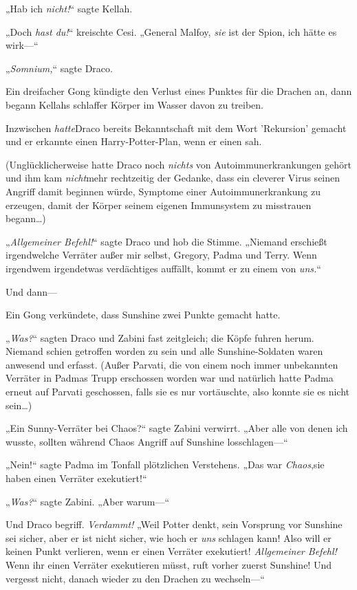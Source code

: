 {„Hab ich \emph{nicht!}“ sagte Kellah.

„Doch \emph{hast du!}“ kreischte Cesi. „General Malfoy, \emph{sie} ist der Spion, ich hätte es wirk—“

„\emph{Somnium,}“ sagte Draco.

Ein dreifacher Gong kündigte den Verlust eines Punktes für die Drachen an, dann begann Kellahs schlaffer Körper im Wasser davon zu treiben.

Inzwischen \emph{hatte}Draco bereits Bekanntschaft mit dem Wort 'Rekursion' gemacht und er erkannte einen Harry-Potter-Plan, wenn er einen sah.

(Unglücklicherweise hatte Draco noch \emph{nichts} von Autoimmunerkrankungen gehört und ihm kam \emph{nicht}mehr rechtzeitig der Gedanke, dass ein cleverer Virus seinen Angriff damit beginnen würde, Symptome einer Autoimmunerkrankung zu erzeugen, damit der Körper seinem eigenen Immunsystem zu misstrauen begann…)

„\emph{Allgemeiner Befehl!}“ sagte Draco und hob die Stimme. „Niemand erschießt irgendwelche Verräter außer mir selbst, Gregory, Padma und Terry. Wenn irgendwem irgendetwas verdächtiges auffällt, kommt er zu einem von \emph{uns.}“

Und dann—

Ein Gong verkündete, dass Sunshine zwei Punkte gemacht hatte.

„\emph{Was?}“ sagten Draco und Zabini fast zeitgleich; die Köpfe fuhren herum. Niemand schien getroffen worden zu sein und alle Sunshine-Soldaten waren anwesend und erfasst. (Außer Parvati, die von einem noch immer unbekannten Verräter in Padmas Trupp erschossen worden war und natürlich hatte Padma erneut auf Parvati geschossen, falls sie es nur vortäuschte, also konnte sie es nicht sein…)

„Ein Sunny-Verräter bei Chaos?“ sagte Zabini verwirrt. „Aber alle von denen ich wusste, sollten während Chaos Angriff auf Sunshine losschlagen—“

„Nein!“ sagte Padma im Tonfall plötzlichen Verstehens. „Das war \emph{Chaos},sie haben einen Verräter exekutiert!“

„\emph{Was?}“ sagte Zabini. „Aber warum—“

Und Draco begriff. \emph{Verdammt!} „Weil Potter denkt, sein Vorsprung vor Sunshine sei sicher, aber er ist nicht sicher, wie hoch er \emph{uns} schlagen kann! Also will er keinen Punkt verlieren, wenn er einen Verräter exekutiert! \emph{Allgemeiner Befehl!} Wenn ihr einen Verräter exekutieren müsst, ruft vorher zuerst Sunshine! Und vergesst nicht, danach wieder zu den Drachen zu wechseln—“

}
